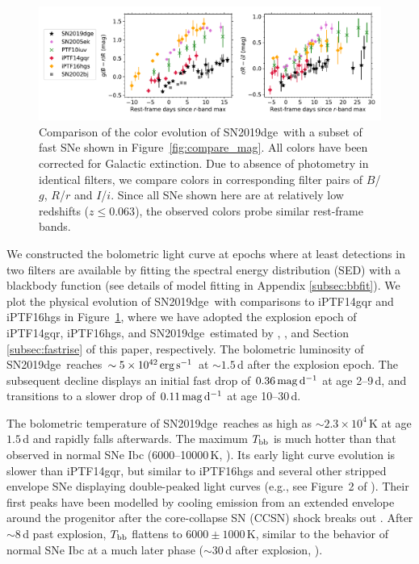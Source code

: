 \documentclass[twocolumn]{aastex63}
\newcommand{\name}{SN2019dge}
\begin{document}
\begin{CJK*}{UTF8}{gbsn}
\begin{figure}[!htbp]
	\label{fig:Tbb_Rbb_Lbb}
\end{figure}
\begin{figure}[htbp!]
	\centering
	\includegraphics[width=\textwidth]{figures/compare_color.pdf}
	\caption{Comparison of the color evolution of \name\ with a subset of fast SNe shown in 
		Figure~\ref{fig:compare_mag}. All colors have been corrected for Galactic extinction. Due to 
		absence of photometry in identical filters, we compare colors in corresponding filter pairs of 
		$B$/$g$, $R$/$r$ and $I$/$i$. Since all SNe shown here are at relatively low redshifts ($z\leq 
		0.063$), the observed colors probe similar rest-frame bands. \label{fig:compare_color}}
\end{figure}

We constructed the bolometric light curve at epochs where at least detections in two 
filters are available by fitting the spectral energy distribution (SED) with a blackbody function (see 
details of model fitting in Appendix \ref{subsec:bbfit}). We plot the physical evolution of \name\ 
with comparisons to iPTF14gqr and iPTF16hgs in Figure~\ref{fig:Tbb_Rbb_Lbb}, where we have 
adopted the explosion epoch of iPTF14gqr, iPTF16hgs, and \name\ estimated by \citet{De2018}, 
\citet{DeKC2018}, and Section \ref{subsec:fastrise} of this paper, respectively. The bolometric 
luminosity of \name\ reaches $\sim 5\times 10^{42}\,{\rm erg\, s^{-1}}$ 
at $\sim 1.5$\,d after the explosion epoch. The subsequent decline displays an initial 
fast drop of $0.36\,{\rm mag\,d^{-1}}$ at age 2--9\,d, and transitions to a slower drop of $0.11\,{\rm 
mag\,d^{-1}}$ at age 10--30\,d. 

The bolometric temperature of \name\ reaches as high as $\sim 2.3\times 10^4$\,K at age $1.5$\,d 
and rapidly falls afterwards. The maximum $T_{\rm bb}$ is much hotter than that observed in normal 
SNe Ibc (6000--10000\,K, \citealt{Taddia2018}). Its early light curve evolution is slower than iPTF14gqr, 
but similar to iPTF16hgs and several other stripped envelope SNe displaying double-peaked light curves 
(e.g., see Figure~2 of \citealt{Fremling2019}). Their first peaks have been modelled by cooling emission 
from an extended envelope around the progenitor after the core-collapse SN (CCSN) shock breaks out 
\citep{Modjaz2019}. After $\sim 8$\,d past explosion, $T_{\rm bb}$ flattens to $6000\pm1000$\,K, 
similar to the behavior of normal SNe Ibc at a much later phase ($\sim30$\,d after explosion, 
\citealt{Taddia2018}).


\end{CJK*}
\end{document}
